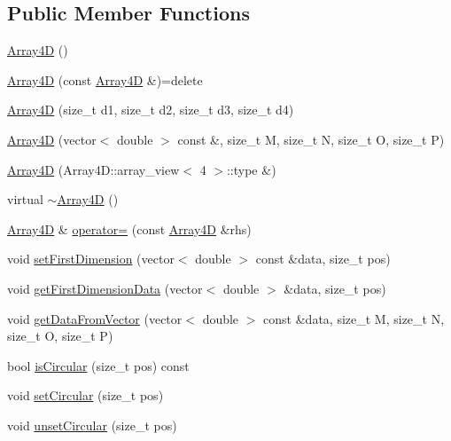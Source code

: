 \subsection*{Public Member Functions}
\begin{DoxyCompactItemize}
\item 
\mbox{\hyperlink{class_array4_d_a1bc84c0dcc22ed0e218040b01f56b816}{Array4D}} ()
\item 
\mbox{\hyperlink{class_array4_d_a71a55de20984154a6b7e31eec8993a24}{Array4D}} (const \mbox{\hyperlink{class_array4_d}{Array4D}} \&)=delete
\item 
\mbox{\hyperlink{class_array4_d_a2b0e0536b5e40fec5694fdcaebdcff6a}{Array4D}} (size\+\_\+t d1, size\+\_\+t d2, size\+\_\+t d3, size\+\_\+t d4)
\item 
\mbox{\hyperlink{class_array4_d_a3bdc27c55418d992f2278f54fa8186e5}{Array4D}} (vector$<$ double $>$ const \&, size\+\_\+t M, size\+\_\+t N, size\+\_\+t O, size\+\_\+t P)
\item 
\mbox{\hyperlink{class_array4_d_a5c5b3aa5f576edefc2e9a61afa87e451}{Array4D}} (Array4\+D\+::array\+\_\+view$<$ 4 $>$\+::type \&)
\item 
virtual \mbox{\hyperlink{class_array4_d_ae82ddfe43f803f16e7904dc839b63eab}{$\sim$\+Array4D}} ()
\item 
\mbox{\hyperlink{class_array4_d}{Array4D}} \& \mbox{\hyperlink{class_array4_d_aa56a432098cf289a2cc340dfc5635634}{operator=}} (const \mbox{\hyperlink{class_array4_d}{Array4D}} \&rhs)
\item 
void \mbox{\hyperlink{class_array4_d_a05273ec7b80fb8eb738dfcf74a54ab5f}{set\+First\+Dimension}} (vector$<$ double $>$ const \&data, size\+\_\+t pos)
\item 
void \mbox{\hyperlink{class_array4_d_a3f8123825b362550f792aa6d0a114304}{get\+First\+Dimension\+Data}} (vector$<$ double $>$ \&data, size\+\_\+t pos)
\item 
void \mbox{\hyperlink{class_array4_d_ae059c2a19884a0d4e45995e997b55dfe}{get\+Data\+From\+Vector}} (vector$<$ double $>$ const \&data, size\+\_\+t M, size\+\_\+t N, size\+\_\+t O, size\+\_\+t P)
\item 
bool \mbox{\hyperlink{class_array4_d_abbcf6caa1305cd5709e6f194e961614d}{is\+Circular}} (size\+\_\+t pos) const
\item 
void \mbox{\hyperlink{class_array4_d_ab4574e45a22610a3e9768542afe76797}{set\+Circular}} (size\+\_\+t pos)
\item 
void \mbox{\hyperlink{class_array4_d_ac6d1282e0d765748c192a72d60274853}{unset\+Circular}} (size\+\_\+t pos)

\end{DoxyCompactItemize}
